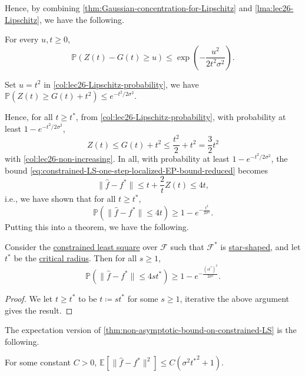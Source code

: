 Hence, by combining \autoref{thm:Gaussian-concentration-for-Lipschitz} and \autoref{lma:lec26-Lipschitz}, we have the following.

\begin{corollary}\label{col:lec26-Lipschitz-probability}
	For every \(u, t \geq 0\),
	\[
		\mathbb{P} \left( Z(t) - G(t) \geq u \right) \leq \exp(- \frac{u^2}{2 t^2 \sigma ^2}).
	\]
\end{corollary}

\begin{note}
	Set \(u = t^2\) in \autoref{col:lec26-Lipschitz-probability}, we have \(\mathbb{P} \left( Z(t) \geq G(t) + t^2 \right) \leq e^{- t^2 / 2 \sigma ^2}\).
\end{note}

Hence, for all \(t \geq t^{\ast} \), from \autoref{col:lec26-Lipschitz-probability}, with probability at least \(1 - e^{-t^2 / 2 \sigma ^2}\),
\[
	Z(t) \leq G(t) + t^2 \leq \frac{t^2}{2} + t^2 = \frac{3}{2}t^2
\]
with \autoref{col:lec26-non-increasing}. In all, with probability at least \(1 - e^{-t^2 / 2 \sigma ^2}\), the bound \autoref{eq:constrained-LS-one-step-localized-EP-bound-reduced} becomes
\[
	\lVert \hat{f} - f^{\ast} \rVert
	\leq t + \frac{2}{t} Z(t)
	\leq 4t,
\]
i.e., we have shown that for all \(t \geq t^{\ast} \),
\[
	\mathbb{P} \left( \lVert \hat{f} - f^{\ast} \rVert \leq 4t \right) \geq 1 - e^{-\frac{t^2}{2 \sigma ^2}}.
\]
Putting this into a theorem, we have the following.

\begin{theorem}\label{thm:non-asymptotic-bound-on-constrained-LS}
	Consider the \hyperref[prb:constrained-LS]{constrained least square} over \(\mathscr{F} \) such that \(\mathscr{F} ^{\ast} \) is \hyperref[def:star-shaped]{star-shaped}, and let \(t^{\ast} \) be the \hyperref[def:critical-radius]{critical radius}. Then for all \(s \geq 1\),
	\[
		\mathbb{P} \left( \lVert \hat{f} - f^{\ast} \rVert \leq 4 s t^{\ast} \right) \geq 1 - e^{-\frac{(s t^{\ast} )^2}{2 \sigma ^2}}.
	\]
\end{theorem}
\begin{proof}
	We let \(t \geq t^{\ast} \) to be \(t \coloneqq s t^{\ast} \) for some \(s \geq 1\), iterative the above argument gives the result.
\end{proof}

The expectation version of \autoref{thm:non-asymptotic-bound-on-constrained-LS} is the following.

\begin{remark}
	For some constant \(C > 0\), \(\mathbb{E}_{}[ \lVert \hat{f} - f^{\ast} \rVert ^2 ] \leq C (\sigma ^2 {t^{\ast} }^2 + 1)\).
\end{remark}

